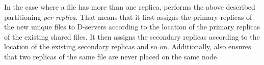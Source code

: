 %
In the case where a file has more than one replica, \sysname performs the
above described partitioning \emph{per replica}. That means that it first assigns
the primary replicas of the new unique files to D-servers according
to the location of the primary replicas of the existing shared files. It then assigns the secondary
replicas according to the location of the existing secondary replicas and so on.
Additionally, \sysname also ensures that two replicas of the same file are never
placed on the same node.



